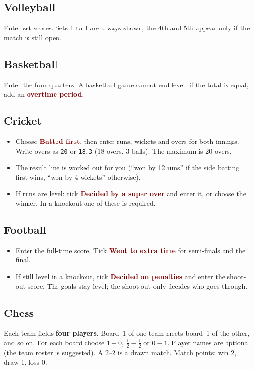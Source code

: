 \documentclass[11pt,a4paper]{article}
\newcommand{\ui}[1]{\textbf{\textcolor{maroon}{#1}}}
\begin{document}
\subsection{Volleyball}
Enter set scores. Sets 1 to 3 are always shown; the 4th and 5th appear only if the match is still open.

\subsection{Basketball}
Enter the four quarters. A basketball game cannot end level: if the total is equal, add an \ui{overtime period}.

\subsection{Cricket}
\begin{itemize}
  \item Choose \ui{Batted first}, then enter runs, wickets and overs for both innings. Write overs as \texttt{20} or \texttt{18.3} (18 overs, 3 balls). The maximum is 20 overs.
  \item The result line is worked out for you (``won by 12 runs'' if the side batting first wins, ``won by 4 wickets'' otherwise).
  \item If runs are level: tick \ui{Decided by a super over} and enter it, or choose the winner. In a knockout one of these is required.
\end{itemize}

\subsection{Football}
\begin{itemize}
  \item Enter the full-time score. Tick \ui{Went to extra time} for semi-finals and the final.
  \item If still level in a knockout, tick \ui{Decided on penalties} and enter the shoot-out score. The goals stay level; the shoot-out only decides who goes through.
\end{itemize}

\subsection{Chess}
Each team fields \textbf{four players}. Board~1 of one team meets board~1 of the other, and so on. For each board choose $1-0$, $\frac12-\frac12$ or $0-1$. Player names are optional (the team roster is suggested). A $2$--$2$ is a drawn match.
Match points: win 2, draw 1, loss 0.
\end{document}
